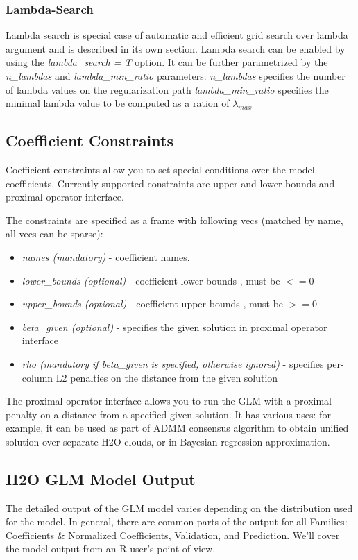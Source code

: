 \documentclass[11pt]{article}
\begin{document}
\subsubsection{Lambda-Search}
Lambda search is special case of automatic and efficient grid search over lambda argument and is described in its own section. Lambda search can be enabled by using the \textit{lambda\_search = T} option. It can be further parametrized by the \textit{n\_lambdas} and \textit{lambda\_min\_ratio} parameters. 
\textit{n\_lambdas} specifies the number of lambda values on the regularization path
\textit{lambda\_min\_ratio} specifies the minimal lambda value to be computed as a ration of $\lambda_{max}$

\subsection{Coefficient Constraints}
Coefficient constraints allow you to set special conditions over the model coefficients. Currently supported constraints are upper and lower bounds and proximal operator \cite{prox} interface. 

The constraints are specified as a frame with following vecs (matched by name, all vecs can be sparse):
\begin{itemize}
\item \textit{names (mandatory)}  - coefficient names. 
\item \textit{lower\_bounds (optional)} - coefficient lower bounds , must be $<= 0$
\item \textit{upper\_bounds (optional)} - coefficient upper bounds , must be $>= 0$
\item \textit{beta\_given (optional)} - specifies the given solution in proximal operator interface
\item \textit{rho (mandatory if beta\_given is specified, otherwise ignored)} - specifies per-column L2 penalties on the distance from the given solution
\end{itemize}
 
The proximal operator interface allows you to run the GLM with a proximal penalty on a distance from a specified given solution. It has various uses: for example, it can be used as part of ADMM consensus algorithm to obtain unified solution over separate H2O clouds, or in Bayesian regression approximation.

\subsection{H2O GLM Model Output}
The detailed output of the GLM model varies depending on the distribution used for the model. In general, there are common parts of the output for all Families: Coefficients \& Normalized Coefficients, Validation, and Prediction. We'll cover the model output from an R user's  point of view.
\end{document}
